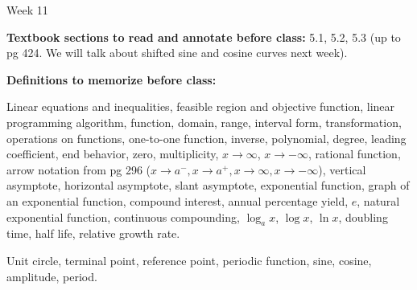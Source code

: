 \documentclass[12pt,dvipsnames]{article}
\begin{document}
\thispagestyle{empty}

	\begin{center}
		{\large{Week 11}}
	\end{center}

{\bfseries{Textbook sections to read and annotate before class:}} 5.1, 5.2, 5.3 (up to pg 424. We will talk about shifted sine and cosine curves next week).

\smallskip

	{\bfseries{Definitions to memorize before class:}} 

\begin{description}[topsep=0pt,itemsep=-2ex,partopsep=0ex,parsep=1ex]
\item[From Weeks 1-10] Linear equations and inequalities, feasible region and objective function, linear programming algorithm,  function, domain, range, interval form, transformation, operations on functions, one-to-one function, inverse, polynomial, degree, leading coefficient, end behavior, zero, multiplicity, $x\to \infty$, $x\to -\infty$, rational function, arrow notation from pg 296 ($x\to a^{-}, x\to a^{+}, x\to \infty, x\to -\infty$), vertical asymptote, horizontal asymptote, slant asymptote, exponential function, graph of an exponential function, compound interest, annual percentage yield, $e$, natural exponential function, continuous compounding, $\log_a x$, $\log x$, $\ln x$, doubling time, half life, relative growth rate.
\item[From Week 11] Unit circle, terminal point, reference point, periodic function, sine, cosine, amplitude, period.
\end{description}
\smallskip	
	
		
		
\end{document}
